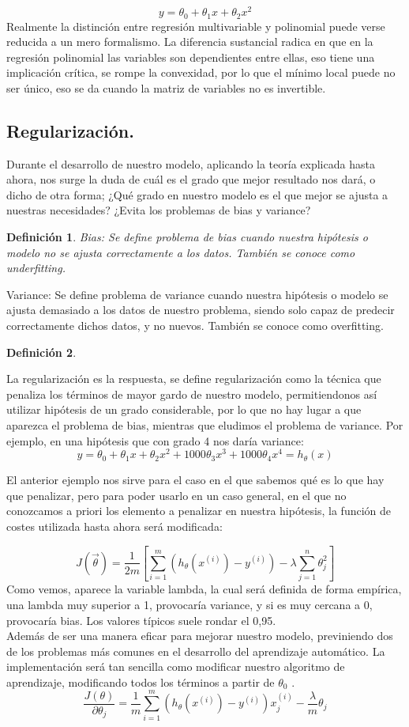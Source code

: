 \documentclass[a4paper,10pt]{article}
\newtheorem{definition}{Definición}
\begin{document}
\[
y=\theta_0+\theta_{1}x+\theta_{2}x^2
\]
Realmente la distinción entre regresión multivariable y polinomial puede verse reducida a un mero formalismo. La diferencia sustancial radica en que en la regresión polinomial las variables son dependientes entre ellas, eso tiene una implicación crítica, se rompe la convexidad, por lo que el mínimo local puede no ser único, eso se da cuando la matriz de variables no es invertible.
\subsection{Regularización.}
\noindent
Durante el desarrollo de nuestro modelo, aplicando la teoría explicada hasta ahora, nos surge la duda de cuál es el grado que mejor resultado nos dará, o dicho de otra forma; ¿Qué grado en nuestro modelo es el que mejor se ajusta a nuestras necesidades? ¿Evita los problemas de bias y variance?\\
\begin{definition}Bias: Se define problema de bias cuando nuestra hipótesis o modelo no se ajusta correctamente a los datos. También se conoce como underfitting.
\end{definition}Variance: Se define problema de variance cuando nuestra hipótesis o modelo se ajusta demasiado a los datos de nuestro problema, siendo solo capaz de predecir correctamente dichos datos, y no nuevos. También se conoce como overfitting.

\begin{definition}
\end{definition}
La regularización es la respuesta, se define regularización como la técnica que penaliza los términos de mayor gardo de nuestro modelo, permitiendonos así utilizar hipótesis de un grado considerable, por lo que no hay lugar a que aparezca el problema de bias, mientras que eludimos el problema de variance. Por ejemplo, en una hipótesis que con grado 4 nos daría variance:
\[
 y=\theta_0+\theta_1 x+\theta_2 x^2+1000\theta_3 x^3+1000\theta_4 x^4 = h_\theta (x)
\]

El anterior ejemplo nos sirve para el caso en el que sabemos qué es lo que hay que penalizar, pero para poder usarlo en un caso general, en el que no conozcamos a priori los elemento a penalizar en nuestra hipótesis, la función de costes utilizada hasta ahora será modificada:

\[
J(\vec{\theta})=\frac{1}{2m}\left[\sum_{i=1}^{m} \left(h_\theta (x^{(i)})-y^{(i)}\right)-\lambda \sum_{j=1}^{n}\theta_{j}^2\right]
\]
Como vemos, aparece la variable lambda, la cual será definida de forma empírica, una lambda muy superior a 1, provocaría variance, y si es muy cercana a 0, provocaría bias. Los valores típicos suele rondar el 0,95.\\
Además de ser una manera eficar para mejorar nuestro modelo, previniendo dos de los problemas más comunes en el desarrollo del aprendizaje automático. La implementación será tan sencilla como modificar nuestro algoritmo de aprendizaje, modificando todos los términos a partir de $\theta_0$ .\\
\[
\frac{J(\theta)}{\partial\theta_j} = \frac{1}{m} \sum_{i=1}^{m} \left(h_\theta (x^{(i)})-y^{(i)}\right) x_{j}^{(i)}-\frac{\lambda}{m} \theta_j 
\]
\end{document}
